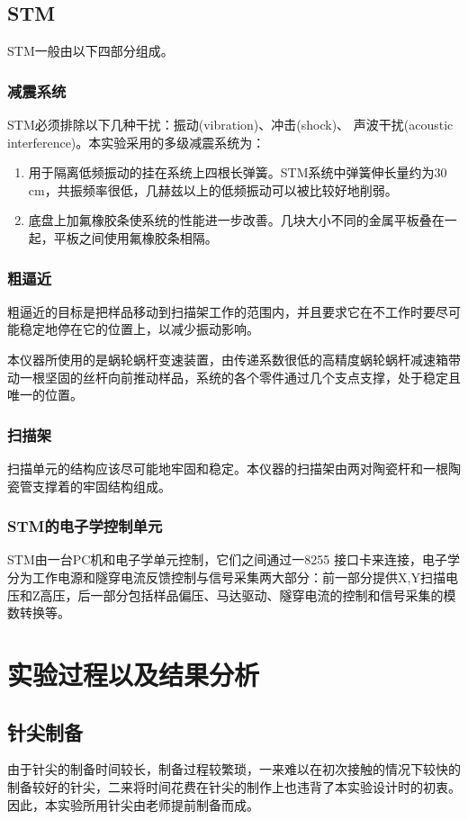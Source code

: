 \documentclass[aps,pre,12pt,preprint,onecolumn,showpacs,showkeys]{revtex4-1}
\begin{document}
\subsection{STM}
STM一般由以下四部分组成。
\subsubsection{减震系统}
STM必须排除以下几种干扰：振动(vibration)、冲击(shock)、 声波干扰(acoustic interference)。本实验采用的多级减震系统为：
\begin{enumerate}
\item 用于隔离低频振动的挂在系统上四根长弹簧。STM系统中弹簧伸长量约为30 cm，共振频率很低，几赫兹以上的低频振动可以被比较好地削弱。
\item 底盘上加氟橡胶条使系统的性能进一步改善。几块大小不同的金属平板叠在一起，平板之间使用氟橡胶条相隔。
\end{enumerate}
\subsubsection{粗逼近}
粗逼近的目标是把样品移动到扫描架工作的范围内，并且要求它在不工作时要尽可能稳定地停在它的位置上，以减少振动影响。\par
本仪器所使用的是蜗轮蜗杆变速装置，由传递系数很低的高精度蜗轮蜗杆减速箱带动一根坚固的丝杆向前推动样品，系统的各个零件通过几个支点支撑，处于稳定且唯一的位置。
\subsubsection{扫描架}
扫描单元的结构应该尽可能地牢固和稳定。本仪器的扫描架由两对陶瓷杆和一根陶瓷管支撑着的牢固结构组成。
\subsubsection{STM的电子学控制单元}
STM由一台PC机和电子学单元控制，它们之间通过一8255 接口卡来连接，电子学分为工作电源和隧穿电流反馈控制与信号采集两大部分：前一部分提供X,Y扫描电压和Z高压，后一部分包括样品偏压、马达驱动、隧穿电流的控制和信号采集的模数转换等。




\section{实验过程以及结果分析}
\subsection{针尖制备}
由于针尖的制备时间较长，制备过程较繁琐，一来难以在初次接触的情况下较快的制备较好的针尖，二来将时间花费在针尖的制作上也违背了本实验设计时的初衷。因此，本实验所用针尖由老师提前制备而成。
\end{document}
